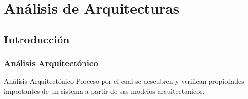 ﻿\documentclass[handout,a4paper,slidestop,xcolor=pst,blue]{beamer}
\begin{document}
\section{Análisis de Arquitecturas}

\subsection{Introducción}

\begin{frame}[c]
	\frametitle{Análisis Arquitectónico}
	\begin{block}{Análisis Arquitectónico}
		Proceso por el cual se descubren y verifican propiedades importantes de un sistema a partir de sus
		modelos arquitectónicos.
	\end{block}
\end{frame}

%
\end{document}
